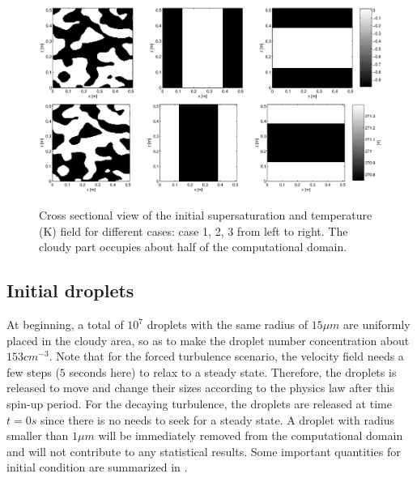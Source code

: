 \documentclass[draft,jgrga]{AGUTeX}
\begin{document}
\begin{article}
\begin{figure}\center
\includegraphics[width=1.0\textwidth]{Figures/supersat_case123}\\
\includegraphics[width=1.0\textwidth]{Figures/temp_case123}
\caption{Cross sectional view of the initial supersaturation and temperature (K) field for different cases: case 1, 2, 3 from left to right. The cloudy part occupies about half of the computational domain.\label{fig:slice_case123}}
\end{figure}

\subsection{Initial droplets}

At beginning, a total of $10^{7}$ droplets with the same radius of $15\mu m$  are uniformly placed in the cloudy area, so as to make the droplet number concentration about $153{cm}^{-3}$. Note that for the forced turbulence scenario, the velocity field needs a few steps ($5$ seconds here) to relax to a steady state. Therefore, the droplets is released to move and change their sizes according to the physics law after this spin-up period. For the decaying turbulence, the droplets are released at time $t = 0s$ since there is no needs to seek for a steady state. A droplet with radius smaller than $1\mu m$ will be immediately removed from the computational domain and will not contribute to any statistical results. Some important quantities for initial condition are summarized in .


\end{article}
\end{document}
